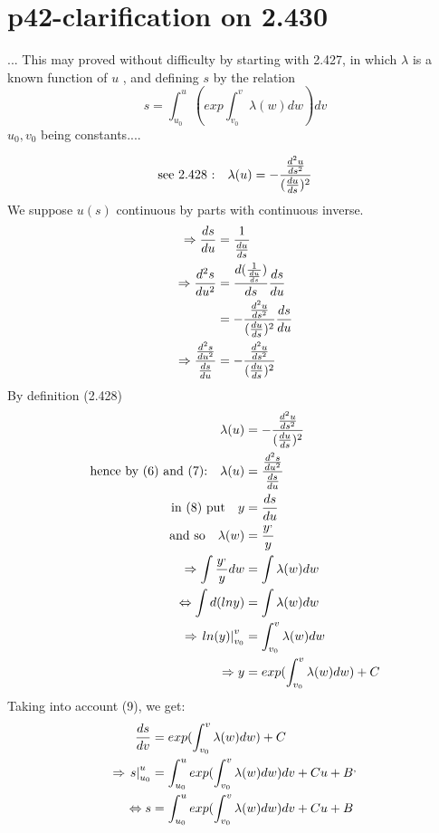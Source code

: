 \section{p42-clarification on 2.430}
\begin{tcolorbox}
... This may proved without difficulty by starting with 2.427, in which $\lambda$ is a known function of $u$ , and defining $s$ by the relation$$ s = \int^u_{u_0}(exp\int^v_{v_0} \lambda(w)dw)dv$$ $u_0, v_0$ being constants....
\end{tcolorbox}
\begin{align}
\text{see 2.428 :} \quad  \lambda (u)=-\frac{\dv[2]{u}{s}}{(\dv{u}{s})^2}\\
\end{align}
We suppose $u(s)$ continuous by parts with continuous inverse.
\begin{align}
\Rightarrow \dv{s}{u} &= \frac{1}{\dv{u}{s}}\\
\Rightarrow \dv[2]{s}{u}&= \dv{(\frac{1}{\dv{u}{s}})}{s}\dv{s}{u}\\
\ & = -\frac{\dv[2]{u}{s}}{(\dv{u}{s})^2}\dv{s}{u}\\
\Rightarrow \frac{\dv[2]{s}{u}}{\dv{s}{u}} &= - \frac{\dv[2]{u}{s}}{(\dv{u}{s})^2}  
\end{align}
By definition (2.428)
\begin{align}
\ \lambda (u) &= - \frac{\dv[2]{u}{s}}{(\dv{u}{s})^2}\\
\text{hence by (6) and (7):}\quad  \lambda (u) &= \frac{\dv[2]{s}{u}}{\dv{s}{u}}\\
\text{in (8) put}\quad y &= \dv{s}{u} \\
\text{ and so} \quad \lambda (w)  &= \frac{y^,}{y}\\
\Rightarrow \int \frac{y^,}{y}dw &= \int \lambda (w)dw\\
\Leftrightarrow \int d(lny) &= \int \lambda (w)dw\\
\Rightarrow \left. ln(y) \right|^v_{v_0} &= \int^v_{v_0} \lambda (w)dw\\
\Rightarrow y  &= exp(\int^v_{v_0} \lambda (w)dw) + C
\end{align}
Taking into account (9), we get:
\begin{align}
\dv{s}{v}  &= exp(\int^v_{v_0} \lambda (w)dw) + C\\
\Rightarrow \left. s \right|^u_{u_0} &=\int^u_{u_0}  exp(\int^v_{v_0} \lambda (w)dw)dv +Cu + B^,\\
\Leftrightarrow  s  &=\int^u_{u_0}  exp(\int^v_{v_0} \lambda (w)dw)dv +Cu + B
\end{align}

